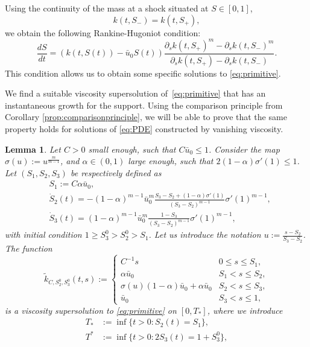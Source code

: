 \documentclass[11pt]{article}
\newtheorem{lemma}[thm]{Lemma}
\numberwithin{equation}{section} %
\newcommand{\p}{{\partial}}
\newcommand{\al}{\alpha}
\begin{document}
Using the continuity of the mass at a shock situated at $S\in [0,1]$,
$$k(t,S_-) = k(t,S_+),$$
we obtain the following Rankine-Hugoniot condition:
\begin{equation*}
    \frac{dS}{dt} = (k(t,S(t)) - \bar u_0 S(t)) \frac{\p_sk(t,S_+)^m- \p_sk(t,S_-)^m}{\p_sk(t,S_+)-\p_sk(t,S_-)}.
\end{equation*}
This condition allows us to obtain some specific solutions to \eqref{eq:primitive}.

We find a suitable viscosity supersolution of~\eqref{eq:primitive} that has an instantaneous growth for the support. Using the comparison principle from Corollary \ref{prop:comparisonprinciple}, we will be able to prove that the same property holds for solutions of \eqref{eq:PDE} constructed by vanishing viscosity. 

\begin{lemma}\label{lemma:supersolution}
    Let $C>0$ small enough, such that $C\bar u_0 \le 1$. Consider the map $ \sigma(u) := u^\frac{m}{m-1}$, and $\al \in (0,1)$ large enough, such that $2(1-\al)\sigma'(1)\le 1$. Let $(S_1,S_2,S_3)$ be respectively defined as
    \begin{align*}
        &S_1 := C\al \bar u_0,\\ 
        &\dot S_2 (t) = -(1-\al)^{m-1}\bar u_0^m \frac{S_3-S_2 + (1-\al)\sigma'(1) }{(S_3-S_2)^{m-1}}\sigma'(1)^{m-1},  \\
        &\dot S_3 (t) = (1-\al)^{m-1}\bar u_0^m \frac{1-S_3}{(S_3-S_2)^{m-1}}\sigma'(1)^{m-1},
    \end{align*}
    with initial condition $1\ge S_3^0> S_2^0> S_1$. Let us introduce the notation $\displaystyle u := \frac{s-S_2}{S_3-S_2}$. The function
    \begin{equation*}
     \tilde k_{C,S_2^0,S_3^0}(t,s) := \begin{cases}
        C^{-1}s & 0\le s \le S_1, \\
        \al \bar u_0 & S_1 < s \le S_2, \\
    \sigma(u) (1-\al )\bar u_0 + \al \bar u_0 & S_2 < s \le S_3, \\
    \bar u_0  & S_3 < s \le 1,
    \end{cases}
    \end{equation*}
    is a viscosity supersolution to \eqref{eq:primitive} on $[0,T_*]$, where we introduce
    \begin{align*}
        T_* &:= \inf\{t>0 : S_2(t) = S_1\},\\
         T^* &:=\inf\{t>0 : 2S_3(t) = 1 +S_3^0\},

\end{align*}
\end{lemma}
\end{document}
